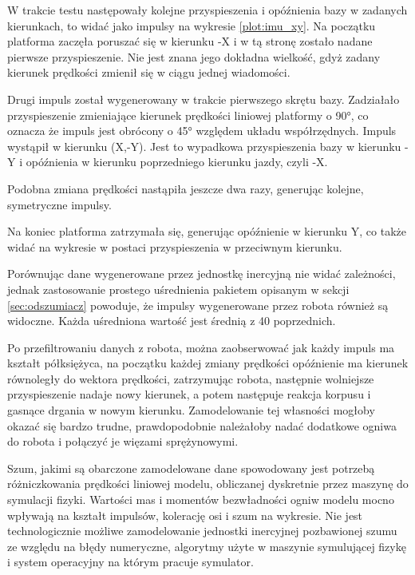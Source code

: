 		W trakcie testu następowały kolejne przyspieszenia i opóźnienia bazy w zadanych kierunkach, to widać jako impulsy na wykresie \ref{plot:imu_xy}.
		Na początku platforma zaczęła poruszać się w kierunku -X i w tą stronę zostało nadane pierwsze przyspieszenie.
		Nie jest znana jego dokładna wielkość, gdyż zadany kierunek prędkości zmienił się w ciągu jednej wiadomości.
		
		Drugi impuls został wygenerowany w trakcie pierwszego skrętu bazy.
		Zadziałało przyspieszenie zmieniające kierunek prędkości liniowej platformy o 90°, co oznacza że impuls jest obrócony o 45° względem układu współrzędnych.
		Impuls wystąpił w kierunku (X,-Y). 
		Jest to wypadkowa przyspieszenia bazy w kierunku -Y i opóźnienia w kierunku poprzedniego kierunku jazdy, czyli -X.
		
		Podobna zmiana prędkości nastąpiła jeszcze dwa razy, generując kolejne, symetryczne impulsy.
		
		Na koniec platforma zatrzymała się, generując opóźnienie w kierunku Y, co także widać na wykresie w postaci przyspieszenia w przeciwnym kierunku.
		
		Porównując dane wygenerowane przez jednostkę inercyjną nie widać zależności, jednak zastosowanie prostego uśrednienia pakietem opisanym w sekcji \ref{sec:odszumiacz} powoduje, że impulsy wygenerowane przez robota również są widoczne. Każda uśredniona wartość jest średnią z 40 poprzednich.
		
		Po przefiltrowaniu danych z robota, można zaobserwować jak każdy impuls ma kształt półksiężyca, na początku każdej zmiany prędkości opóźnienie ma kierunek równoległy do wektora prędkości, zatrzymując robota, następnie wolniejsze przyspieszenie nadaje nowy kierunek, a potem następuje reakcja korpusu i gasnące drgania w nowym kierunku. 
		Zamodelowanie tej własności mogłoby okazać się bardzo trudne, prawdopodobnie należałoby nadać dodatkowe ogniwa do robota i połączyć je więzami sprężynowymi.
		
		Szum, jakimi są obarczone zamodelowane dane spowodowany jest potrzebą różniczkowania prędkości liniowej modelu, obliczanej dyskretnie przez maszynę do symulacji fizyki. 
		Wartości mas i momentów bezwładności ogniw modelu mocno wpływają na kształt impulsów, kolerację
		osi i szum na wykresie. 
		Nie jest technologicznie możliwe zamodelowanie jednostki inercyjnej pozbawionej szumu ze względu na błędy numeryczne, algorytmy użyte w maszynie
		symulującej fizykę i system operacyjny na którym pracuje symulator.
		
